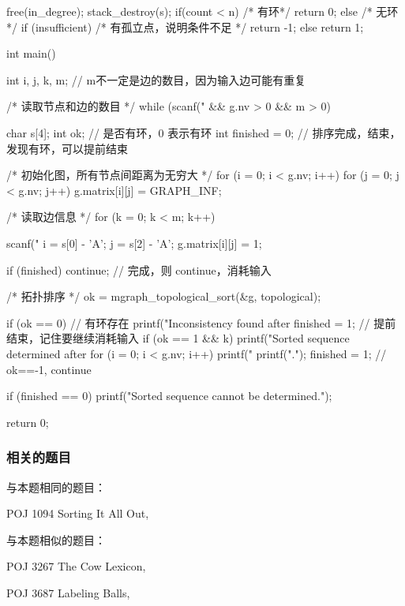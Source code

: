 \begin{Codex}[label=poj_1094.c]
{    free(in_degree);
    stack_destroy(s);
    if(count < n) { /* 有环*/
        return 0;
    } else { /* 无环*/
        if (insufficient) {  /* 有孤立点，说明条件不足 */
            return -1;
        } else {
            return 1;
        }
    }
}

int main() {
    int i, j, k, m;  // m不一定是边的数目，因为输入边可能有重复

    /* 读取节点和边的数目 */
    while (scanf("%
            && g.nv > 0 && m > 0) {
        char s[4];
        int ok;  // 是否有环，0 表示有环
        int finished = 0;  // 排序完成，结束，发现有环，可以提前结束

        /* 初始化图，所有节点间距离为无穷大 */
        for (i = 0; i < g.nv; i++) {
            for (j = 0; j < g.nv; j++) {
                g.matrix[i][j] = GRAPH_INF;
            }
        }

        /* 读取边信息 */
        for (k = 0; k < m; k++) {
            scanf("%
            i = s[0] - 'A';
            j = s[2] - 'A';
            g.matrix[i][j] = 1;

            if (finished) continue;    // 完成，则 continue，消耗输入

            /* 拓扑排序 */
            ok = mgraph_topological_sort(&g, topological);

            if (ok == 0) {  // 有环存在
                printf("Inconsistency found after %
                finished = 1;  // 提前结束，记住要继续消耗输入
            }
            if (ok == 1 && k) {
                printf("Sorted sequence determined after %
                for (i = 0; i < g.nv; i++) {
                    printf("%
                }
                printf(".\n");
                finished = 1;
            }
            // ok==-1, continue
        }
        if (finished == 0) {
            printf("Sorted sequence cannot be determined.\n");
        }
    }
    return 0;
}
\end{Codex}

\subsubsection{相关的题目}
与本题相同的题目：
\begindot
\item POJ 1094 Sorting It All Out, 
\myenddot

与本题相似的题目：
\begindot
\item POJ 3267 The Cow Lexicon, 
\item POJ 3687 Labeling Balls, 
\myenddot


